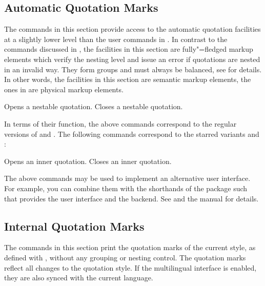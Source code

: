 \documentclass{ltxdockit}[2010/09/26]
\begin{document}
\subsection{Automatic Quotation Marks}
\label{aut:amk}

The commands in this section provide access to the automatic quotation facilities at a slightly lower level than the user commands in . In contrast to the commands discussed in , the facilities in this section are fully"=fledged markup elements which verify the nesting level and issue an error if quotations are nested in an invalid way. They form groups and must always be balanced, see  for details. In other words, the facilities in this section are semantic markup elements, the ones in  are physical markup elements.

\begin{ltxsyntax}

 Opens a nestable quotation.
 Closes a nestable quotation.

\end{ltxsyntax}

In terms of their function, the above commands correspond to the regular versions of  and . The following commands correspond to the starred variants  and :

\begin{ltxsyntax}

 Opens an inner quotation.
 Closes an inner quotation.

\end{ltxsyntax}

The above commands may be used to implement an alternative user interface. For example, you can combine them with the shorthands of the  package such that  provides the user interface and  the backend. See  and the  manual for details.

\subsection{Internal Quotation Marks}
\label{aut:imk}

The commands in this section print the quotation marks of the current style, as defined with , without any grouping or nesting control. The quotation marks reflect all changes to the quotation style. If the multilingual interface is enabled, they are also synced with the current language.
\end{document}
